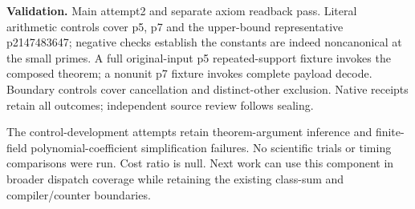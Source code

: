 \documentclass[10pt]{article}
\begin{document}
\textbf{Validation.} Main attempt2 and separate axiom readback pass. Literal arithmetic controls cover p5, p7 and the upper-bound representative p2147483647; negative checks establish the constants are indeed noncanonical at the small primes. A full original-input p5 repeated-support fixture invokes the composed theorem; a nonunit p7 fixture invokes complete payload decode. Boundary controls cover cancellation and distinct-other exclusion. Native receipts retain all outcomes; independent source review follows sealing.

The control-development attempts retain theorem-argument inference and finite-field polynomial-coefficient simplification failures. No scientific trials or timing comparisons were run. Cost ratio is null. Next work can use this component in broader dispatch coverage while retaining the existing class-sum and compiler/counter boundaries.
\end{document}
